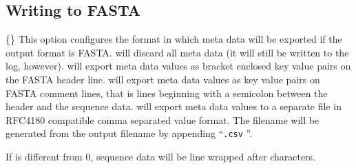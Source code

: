 \documentclass[english,a4paper]{article}
\begin{document}
\subsection{Writing to FASTA}
\begin{Description}
\item[\Opt{-{}-meta-fmt }\{\Arg{none}\Bar\Arg{header}\Bar\Arg{comment}\Bar\Arg{csv}\}] 
This option configures the 
format in which meta data will be exported if the output format is FASTA.  will discard all meta data (it 
will still be written to the log, however).  will export meta data values as bracket enclosed key
value pairs on the FASTA header line.  will export meta data values as key value pairs on FASTA 
comment lines, that is lines beginning with a semicolon between the header and the sequence data.  will 
export meta data values to a separate file in RFC4180 compatible comma separated value format. The filename
will be generated from the output filename by appending ``\texttt{.csv} ''. 
\item[\OptArg{-{}-line-length }{n}] 
If  is different from 0, sequence data will be line wrapped after 
characters. 
\end{Description}
\end{document}
